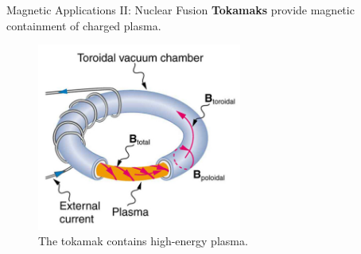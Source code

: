 \documentclass{beamer}
\begin{document}
\begin{frame}{Magnetic Applications II: Nuclear Fusion}
\textbf{\alert{Tokamaks}} provide magnetic containment of charged plasma.
\begin{figure}
\centering
\includegraphics[width=0.6\textwidth]{figures/tokamak.png}
\caption{\label{fig:tokamak} The tokamak contains high-energy plasma.}
\end{figure}
\end{frame}
\end{document}
